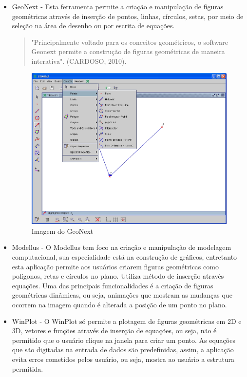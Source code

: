 \documentclass[12pt,a4paper]{article}
\begin{document}
\begin{itemize}
\begin{itemize}
\item GeoNext - Esta ferramenta permite a criação e manipulação de figuras geométricas através de inserção de pontos, linhas, círculos, setas, por meio de seleção na área de desenho ou por escrita de equações.
\begin{quote}
"Principalmente voltado para os conceitos geométricos, o software Geonext permite a construção de figuras geométricas de maneira interativa". (CARDOSO, 2010).
\end{quote}

\begin{figure}[!h]
\centering
\includegraphics[scale=0.23]{imagens/geonext.png} 
\caption{Imagem do GeoNext}
\end{figure}

\item Modellus - O Modellus tem foco na criação e manipulação de modelagem computacional, sua especialidade está na construção de gráficos, entretanto esta aplicação permite aos usuários criarem figuras geométricas como polígonos, retas e círculos no plano. Utiliza método de inserção através equações.
    Uma das principais funcionalidades é a criação de figuras geométricas dinâmicas, ou seja, animações que mostram as mudanças que ocorrem na imagem quando é alterada a posição de um ponto no plano.

\item WinPlot - O WinPlot só permite a plotagem de figuras geométricas em 2D e 3D, vetores e funções através de inserção de equações, ou seja, não é permitido que o usuário clique na janela para criar um ponto. As equações que são digitadas na entrada de dados são predefinidas, assim, a aplicação evita erros cometidos pelos usuário, ou seja, mostra ao usuário a estrutura permitida.


\end{itemize}
\end{itemize}
\end{document}
